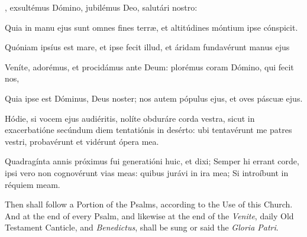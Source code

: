 {, exsultémus Dómino, jubilémus Deo, salutári nostro:\par
{}
Quia in manu ejus sunt omnes fines terr{\ae}, et altitúdines móntium ipse cónspicit.\par
Quóniam ipsíus est mare, et ipse fecit illud, et áridam fundavérunt manus ejus\par
Veníte, adorémus, et procidámus ante Deum: plorémus coram Dómino, qui fecit nos,\par
Quia ipse est Dóminus, Deus noster; nos autem pópulus ejus, et oves páscu{\ae} ejus.\par
Hódie, si vocem ejus audiéritis, nolíte obduráre corda vestra, sicut in exacerbatióne secúndum diem tentatiónis in desérto: ubi tentavérunt me patres vestri, probavérunt et vidérunt ópera mea.
\par
Quadragínta annis próximus fui generatióni huic, et dixi; Semper hi errant corde, ipsi vero non cognovérunt vias meas: quibus jurávi in ira mea; Si introíbunt in réquiem meam.}

\begin{rubric}
    Then shall follow a Portion of the Psalms, according to the Use of this Church. And at the end of every Psalm, and likewise at the end of the \emph{Venite}, daily Old Testament Canticle, and \emph{Benedictus}, shall be sung or said the \emph{Gloria Patri}.
\end{rubric}

